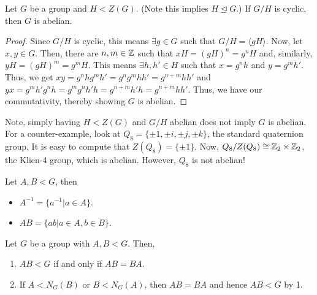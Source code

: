 \documentclass[11pt,leqno,oneside]{amsart}
\newcommand{\subgroup}{\mathrel{<}}
\newcommand{\normsubgroup}{\mathrel{\unlhd}}
\begin{document}
    \begin{lem}
        Let $G$ be a group and $H \subgroup Z(G)$. (Note this implies $H
        \normsubgroup G$.) If $G/H$ is cyclic, then $G$ is abelian.
    \end{lem}
    \begin{proof}
        Since $G/H$ is cyclic, this means $\exists g \in G$ such that
        $G/H=\langle gH \rangle$. Now, let $x,y \in G$. Then, there are $n,m
        \in {\mathbb Z}$ such that $xH = (gH)^n = g^nH$ and, similarly, $yH = (gH)^m =
        g^mH$. This means $\exists h,h' \in H$ such that $x=g^nh$ and
        $y=g^mh'$. Thus, we get $xy = g^nhg^mh' = g^ng^mhh' = g^{n+m}hh'$ and
        $yx = g^mh'g^nh = g^mg^nh'h = g^{n+m}h'h = g^{n+m}hh'$. Thus, we have
        our commutativity, thereby showing $G$ is abelian.
    \end{proof}
    \begin{rmk*}
        Note, simply having $H \subgroup Z(G)$ and $G/H$ abelian does not imply
        $G$ is abelian. For a counter-example, look at $Q_8 = \{\pm 1, \pm i,
        \pm j, \pm k\}$, the standard quaternion group. It is easy to compute
        that $Z(Q_8) = \{\pm 1\}$. Now, $Q_8/Z(Q_8) \mathrel{\cong} {\mathbb Z}_2 \times {\mathbb Z}_2$,
        the Klien-4 group, which is abelian. However, $Q_8$ is not abelian!
    \end{rmk*}
    \begin{defn}
        Let $A,B \subgroup G$, then \begin{itemize}
            \item $A^{-1} = \{a^{-1} | a \in A\}$.
            \item $AB = \{ab | a \in A, b \in B\}$.
        \end{itemize}
    \end{defn}
    \begin{lem}
        Let $G$ be a group with $A,B \subgroup G$. Then,
        \begin{enumerate}
            \item $AB \subgroup G$ if and only if $AB = BA$.
            \item If $A \subgroup N_G(B)$ or $B \subgroup N_G(A)$, then $AB =
                BA$ and hence $AB \subgroup G$ by 1.
        \end{enumerate}
    \end{lem}
\end{document}
